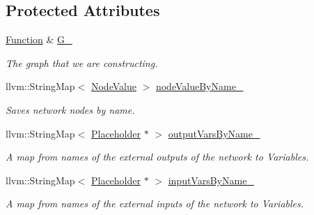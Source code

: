 \subsection*{Protected Attributes}
\begin{DoxyCompactItemize}
\item 
\mbox{\label{classglow_1_1_protobuf_loader_ac16d6a010eff091f2741bcd217330c20}} 
\hyperlink{classglow_1_1_function}{Function} \& \hyperlink{classglow_1_1_protobuf_loader_ac16d6a010eff091f2741bcd217330c20}{G\+\_\+}
\begin{DoxyCompactList}\small\item\em The graph that we are constructing. \end{DoxyCompactList}\item 
\mbox{\label{classglow_1_1_protobuf_loader_aa0537bf30bcdeb245f90d266bec80146}} 
llvm\+::\+String\+Map$<$ \hyperlink{structglow_1_1_node_value}{Node\+Value} $>$ \hyperlink{classglow_1_1_protobuf_loader_aa0537bf30bcdeb245f90d266bec80146}{node\+Value\+By\+Name\+\_\+}
\begin{DoxyCompactList}\small\item\em Saves network nodes by name. \end{DoxyCompactList}\item 
\mbox{\label{classglow_1_1_protobuf_loader_acd798ac70c0f8ebf3036b9dd25969484}} 
llvm\+::\+String\+Map$<$ \hyperlink{classglow_1_1_placeholder}{Placeholder} $\ast$ $>$ \hyperlink{classglow_1_1_protobuf_loader_acd798ac70c0f8ebf3036b9dd25969484}{output\+Vars\+By\+Name\+\_\+}
\begin{DoxyCompactList}\small\item\em A map from names of the external outputs of the network to Variables. \end{DoxyCompactList}\item 
\mbox{\label{classglow_1_1_protobuf_loader_aa6a24b02060b09e46f0c8eed907e5b99}} 
llvm\+::\+String\+Map$<$ \hyperlink{classglow_1_1_placeholder}{Placeholder} $\ast$ $>$ \hyperlink{classglow_1_1_protobuf_loader_aa6a24b02060b09e46f0c8eed907e5b99}{input\+Vars\+By\+Name\+\_\+}
\begin{DoxyCompactList}\small\item\em A map from names of the external inputs of the network to Variables. \end{DoxyCompactList}\end{DoxyCompactItemize}


